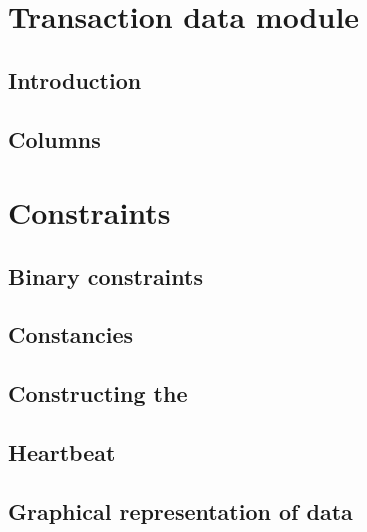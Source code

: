 
\section{Transaction data module}                                           \label{txn_data: generalities}
\subsection{Introduction}                                                   \label{txn_data: generalities: intro}                         
\subsection{Columns}                                                        \label{txn_data: generalities: columns}                       
    
\section{Constraints}                                                       \label{txn_data: constraints}    
\subsection{Binary constraints}                                             \label{txn_data: constraints: binary}                         
\subsection{Constancies}                                                    \label{txn_data: constraints: constancies}                    
\subsection{Constructing the \ABSTXNUM{}}                                   \label{txn_data: constraints: constructing ABS}               
\subsection{Heartbeat}                                                      \label{txn_data: constraints: heartbeat}                      
\subsection{Graphical representation of data}                               \label{txn_data: constraints: graphical representation}       
